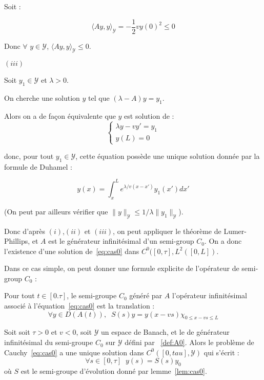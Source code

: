 \documentclass[a4paper]{article}
\begin{document}
\begin{preuve}
Soit :

\[ \langle Ay,y \rangle_{\mathscr{Y}} = -\frac{1}{2}vy(0)^2 \leq 0 \]

Donc $\forall$ $y \in \mathscr{Y}$, $\langle Ay,y \rangle_{\mathscr{Y}} \leq 0$.


\vspace{0.3cm}
$(iii)$

Soit $y_1 \in \mathscr{Y}$ et $\lambda >0$.

On cherche une solution $y$ tel que $(\lambda -A)y = y_1$.

Alors on a de façon équivalente que $y$ est solution de :
\[ \begin{cases}
\lambda y - v y' = y_1 \\
y(L) = 0
\end{cases}\]

donc, pour tout $y_1 \in \mathscr{Y}$, cette équation possède une unique solution donnée par la formule de Duhamel :

\[ y(x) =  \int_x^L e^{\lambda/v (x-x')}y_1(x')dx' \]

(On peut par ailleurs vérifier que $ \| y \|_{\mathscr{Y}} \leq 1/ \lambda \|y_1 \|_{\mathscr{Y}}$).

Donc d'après $(i)$,$(ii)$ et $(iii)$, on peut appliquer le théorème de Lumer-Phillips, et $A$ est le générateur infinitésimal d'un semi-group $C_0$.
On a donc l'existence d'une solution de~\eqref{eq:cas0} 
dans $C^0([0,\tau],L^2([0,L])$.
	
\end{preuve}

Dans ce cas simple, on peut donner une formule explicite de l'opérateur de semi-group $C_0$ :

\begin{lemme}
	\label{lem:cas0}
	Pour tout $t\in[0.\tau]$, le semi-groupe $C_0$ généré par $A$ 
	l'opérateur infinitésimal associé à l'équation~\eqref{eq:cas0} est la translation :
	\[ \forall y \in D(A(t)), \; \; S(s)y = y(x - vs) \chi_{0\leq x-vs \leq L}\]
\end{lemme}

\begin{theoreme}
	Soit soit $\tau>0$ et $v<0$,
	soit $\mathscr{Y}$ un espace de Banach, et le  
	de générateur infinitésimal du semi-groupe $C_0$ sur $\mathscr{Y}$
	défini par ~\eqref{def:A0}.
	Alors le problème de Cauchy~\eqref{eq:cas0} a une unique solution dans $C^0([0,tau],\mathscr{Y})$ qui s'écrit :
	\[ \forall s\in[0,\tau] \; \; y(s) = S(s)y_0 \]
	où $S$ est le semi-groupe d'évolution donné par lemme~\ref{lem:cas0}.
\end{theoreme}
\end{document}
